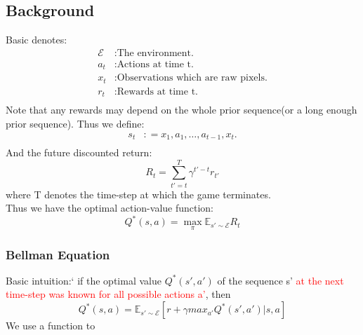 \documentclass{article}
\numberwithin{equation}{section}
\numberwithin{figure}{section}
\newcommand{\citeinclude}[1]{}
\begin{document}
\subsection{Background}
Basic denotes:
\begin{align*}
    \mathcal{E} &: \text{The environment.}\\
    a_t &: \text{Actions at time t.}\\ 
    x_t &: \text{Observations which are raw pixels.}\\
    r_t &: \text{Rewards at time t.}\\
\end{align*}
Note that any rewards may depend on the whole prior sequence(or a long enough prior sequence). Thus we define:
\begin{align*}
        s_t &: = {x_1,a_1,\dots,a_{t-1},x_t}.\\
\end{align*}
And the future discounted return:
\begin{equation*}
        R_t = \sum_{t'=t}^T \gamma^{t'-t} r_{t'}
\end{equation*}
where T denotes the time-step at which the game terminates.\\
Thus we have the optimal action-value function:
\begin{equation*}
        Q^*(s,a)= \max_{\pi} \mathds{E}_{s'\sim\mathcal{E}}R_t
\end{equation*}
\subsubsection*{Bellman Equation}
Basic intuition:` if the optimal value $Q^*(s',a')$ of the sequence s' \textcolor{red}{at the next time-step was known for all possible actions a'}, then
\begin{equation}
        Q^*(s,a) = \mathds{E}_{s' \sim \mathcal{E}}[ r + \gamma max_{a'}Q^*(s',a')|s,a ]
\end{equation}
We use a function to 








\citeinclude{Playing_Atari_with_Deep_Reinforcement_Learning}
\citeinclude{Asynchronous_Methods_for_Deep_Reinforcement_Learning}
\end{document}
